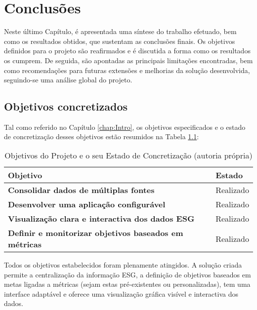 \chapter{Conclusões} 
\label{chap:Conc}

Neste último Capítulo, é apresentada uma síntese do trabalho efetuado, bem como os resultados obtidos, que sustentam as conclusões finais. Os objetivos definidos para o projeto são reafirmados e é discutida a forma como os resultados os cumprem. De seguida, são apontadas as principais limitações encontradas, bem como recomendações para futuras extensões e melhorias da solução desenvolvida, seguindo-se uma análise global do projeto.

\section{Objetivos concretizados} 
\label{sec:ObjConc}

Tal como referido no Capítulo \ref{chap:Intro}, os objetivos especificados e o estado de concretização desses objetivos estão resumidos na Tabela \ref{tab:objective_done_table}:

\begin{table}[H]
    \centering
    \begin{tabular}{|>{\bfseries}p{11cm} |p{4cm}|}
        \hline
        \textbf{Objetivo} & \textbf{Estado} \\
                \hline
        Consolidar dados de múltiplas fontes & Realizado \\
                \hline
        Desenvolver uma aplicação configurável & Realizado \\
                \hline
        Visualização clara e interactiva dos dados ESG & Realizado \\
                \hline
        Definir e monitorizar objetivos baseados em métricas & Realizado \\
                \hline
    \end{tabular}
    \caption{Objetivos do Projeto e o seu Estado de Concretização (autoria própria)}
    \label{tab:objective_done_table}
\end{table}

Todos os objetivos estabelecidos foram plenamente atingidos. A solução criada permite a centralização da informação ESG, a definição de objetivos baseados em metas ligadas a métricas (sejam estas pré-existentes ou personalizadas), tem uma interface adaptável e oferece uma visualização gráfica visível e interactiva dos dados.

